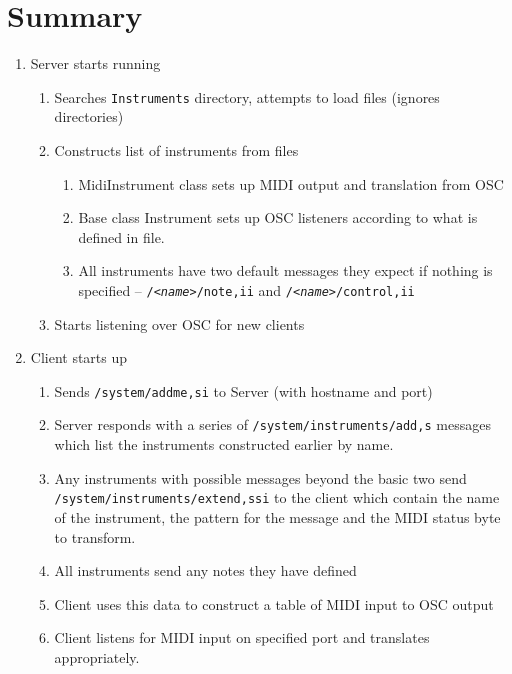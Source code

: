 \documentclass[11pt]{article}
\begin{document}
\raggedright
\section*{Summary}
\begin{enumerate}[\bf1.]
	\item Server starts running
	\begin{enumerate} [\bf a.]
		\item Searches \texttt{Instruments} directory, attempts to load files (ignores directories)
		\item Constructs list of instruments from files
		\begin{enumerate}
			\item MidiInstrument class sets up MIDI output and translation from OSC
			\item Base class Instrument sets up OSC listeners according to what is defined in file.
			\item All instruments have two default messages they expect if nothing is specified -- \texttt{/\textit{<name>}/note,ii} and 
				 \texttt{/\textit{<name>}/control,ii} 
		\end{enumerate}
		\item Starts listening over OSC for new clients
	 \end{enumerate}
	 \item Client starts up
	 \begin{enumerate} [\bf a.]
	 	\item Sends \texttt{/system/addme,si} to Server (with hostname and port)
		\item Server responds with a series of \texttt{/system/instruments/add,s} messages which list the instruments constructed earlier by name.
		\item Any instruments with possible messages beyond the basic two send
			 \texttt{/system/instruments/extend,ssi} to the client
			which contain the name of the instrument, the pattern for the message and the MIDI status byte to transform.
		\item All instruments send any notes they have defined
		\item Client uses this data to construct a table of MIDI input to OSC output
		\item Client listens for MIDI input on specified port and translates appropriately.
	 \end{enumerate}
\end{enumerate}
\end{document}
